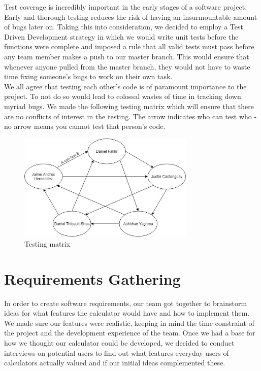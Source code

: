 \documentclass[a4paper]{article}
\begin{document}
Test coverage is incredibly important in the early stages of a software project. Early and thorough testing reduces the risk of having an insurmountable amount of bugs later on. Taking this into consideration, we decided to employ a Test Driven Development strategy in which we would write unit tests before the functions were complete and imposed a rule that all valid tests must pass before any team member makes a push to our master branch. This would ensure that whenever anyone pulled from the master branch, they would not have to waste time fixing someone's bugs to work on their own task. \\

We all agree that testing each other's code is of paramount importance to the project. To not do so would lead to colossal wastes of time in tracking down myriad bugs. We made the following testing matrix which will ensure that there are no conflicts of interest in the testing. The arrow indicates who can test who - no arrow means you cannot test that person's code.

\begin{figure}[!h]
\caption{Testing matrix}
\centering
\includegraphics[width=0.75\textwidth]{TestingMatrix}
\end{figure}

\pagebreak

\section{Requirements Gathering}

In order to create software requirements, our team got together to brainstorm ideas for what features the calculator would have and how to implement them. We made sure our features were realistic, keeping in mind the time constraint of the project and the development experience of the team. Once we had a base for how we thought our calculator could be developed, we decided to conduct interviews on potential users to find out what features everyday users of calculators actually valued and if our initial ideas complemented these. \\
\end{document}

